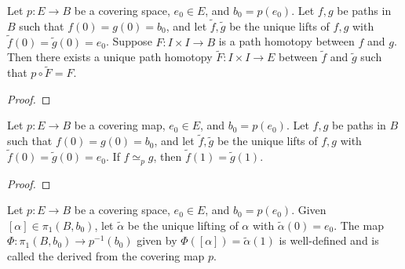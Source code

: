 \begin{lemma}
	Let $p:E \rightarrow B$ be a covering space, $e_0 \in E$, and $b_0 = p(e_0)$. Let $f,g$ be paths in $B$ such that $f(0) = g(0) = b_0$, and let $\tilde{f}, \tilde{g}$ be the unique lifts of $f,g$ with $\tilde{f}(0) = \tilde{g}(0) = e_0$. Suppose $F: I \times I \rightarrow B$ is a path homotopy between $f$ and $g$. Then there exists a unique path homotopy $\tilde{F}:I \times I \rightarrow E$ between $\tilde{f}$ and $\tilde{g}$ such that $p \circ \tilde{F} = F$.
\end{lemma}
	{\color{red}
	\begin{proof}
		
	\end{proof}}

\begin{corollary}
	Let $p:E \rightarrow B$ be a covering map, $e_0 \in E$, and $b_0 = p(e_0)$. Let $f,g$ be paths in $B$ such that $f(0) = g(0) = b_0$, and let $\tilde{f}, \tilde{g}$ be the unique lifts of $f,g$ with $\tilde{f}(0) = \tilde{g}(0) = e_0$. If $f \simeq_p g$, then $\tilde{f}(1) = \tilde{g}(1)$.
\end{corollary}
	{\color{red}
	\begin{proof}
		
	\end{proof}}


\begin{definition}
	Let $p:E \rightarrow B$ be a covering space, $e_0 \in E$, and $b_0 = p(e_0)$. Given $[\alpha] \in \pi_1(B,b_0)$, let $\tilde{\alpha}$ be the unique lifting of $\alpha$ with $\tilde{\alpha}(0) = e_0$. The map $\Phi:\pi_1(B,b_0) \rightarrow p^{-1}(b_0)$ given by $\Phi([\alpha]) = \tilde{\alpha}(1)$ is well-defined and is called the  derived from the covering map $p$.
\end{definition}


